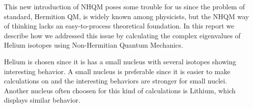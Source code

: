 
This new introduction of NHQM poses some trouble for us since the problem of standard, Hermition QM, is widely known among physicists, but the NHQM way of thinking lacks an easy-to-process theoretical foundation.
In this report we describe how we addressed this issue by calculating the complex eigenvalues of Helium isotopes using Non-Hermitian Quantum Mechanics.

Helium is chosen since it is has a small nucleus with several isotopes showing interesting behavior.
A small nucleus is preferable since it is easier to make calculations on and the interesting behaviors are stronger for small nuclei.
Another nucleus often choosen for this kind of calculations is Lithium, which displays similar behavior.
